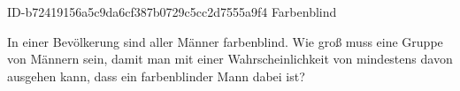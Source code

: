 \begin{exercise}
      {ID-b72419156a5c9da6cf387b0729c5cc2d7555a9f4}
      {Farbenblind}
  \ifproblem\problem\par
    In einer Bevölkerung sind  aller Männer farbenblind. Wie groß muss
    eine Gruppe von Männern sein, damit man mit einer Wahrscheinlichkeit von
    mindestens  davon ausgehen kann, dass ein farbenblinder Mann dabei ist?
  \fi
\end{exercise}

